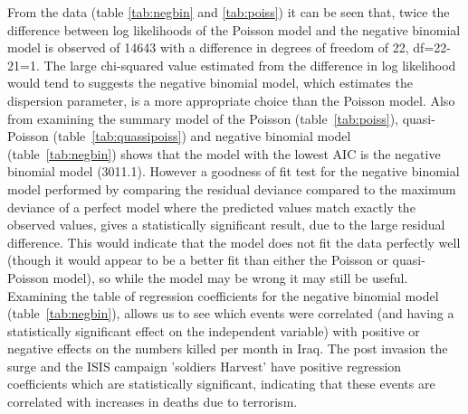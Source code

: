 From the data (table \ref{tab:negbin} and \ref{tab:poiss}) it can be seen that, twice the difference between log likelihoods of the Poisson model and the negative binomial model is observed of 14643 with a difference in degrees of freedom of 22, df=22-21=1. The large chi-squared value estimated from the difference in log likelihood would tend to suggests the negative binomial model, which estimates the dispersion parameter, is a more appropriate choice than the Poisson model. Also from examining the summary model of the Poisson (table~\ref{tab:poiss}), quasi-Poisson (table~\ref{tab:quassipoiss}) and negative binomial model (table~\ref{tab:negbin}) shows that the model with the lowest AIC is the negative binomial model (3011.1). However a goodness of fit test for the negative binomial model performed by comparing the residual deviance compared to the maximum deviance of a perfect model where the predicted values match exactly the observed values, gives a statistically significant result, due to the large residual difference. This would indicate that the model does not fit the data perfectly well (though it would appear to be a better fit than either the Poisson or quasi-Poisson model), so while the model may be wrong it may still be useful. Examining the table of regression coefficients for the negative binomial model (table~\ref{tab:negbin}), allows us to see which events were correlated (and having a statistically significant effect on the independent variable) with positive or negative effects on the numbers killed per month in Iraq. The post invasion the surge and the ISIS campaign 'soldiers Harvest' have positive regression coefficients which are statistically significant, indicating that these events are correlated with increases in deaths due to terrorism.  

